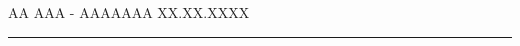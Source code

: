 \documentclass[12pt]{article}
\begin{document}
\thispagestyle{empty}

{\scshape AA } \hfill {\scshape \large AAA - AAAAAAA} \hfill {\scshape XX.XX.XXXX}

\smallskip
\hrule
\bigskip
\end{document}

